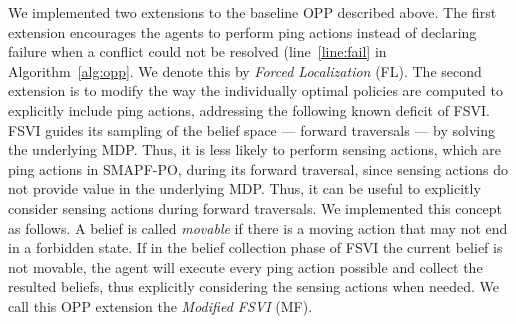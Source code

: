 \documentclass[letterpaper]{article}
\begin{document}
We implemented two extensions to the baseline OPP described above.
The first extension encourages the agents to perform ping actions instead of declaring failure when a conflict could not be resolved (line~\ref{line:fail} in Algorithm~\ref{alg:opp}. We denote this by \emph{Forced Localization} (FL).
The second extension is to modify the way the individually optimal policies are computed to explicitly include ping actions, addressing the following known deficit of FSVI.
FSVI guides its sampling of the belief space --- forward traversals --- by solving the underlying MDP.
Thus, it is less likely to perform sensing actions, which are ping actions in SMAPF-PO, during its forward traversal, since sensing actions do not provide value in the underlying MDP.
Thus, it can be useful to explicitly consider sensing actions during forward traversals.
We implemented this concept as follows.
A belief is called \emph{movable} if there is a moving action that may not end in a forbidden state.
If in the belief collection phase of FSVI the current belief is not movable, the agent will execute every ping action possible and collect the resulted beliefs, thus explicitly considering the sensing actions when needed.
We call this OPP extension the \emph{Modified FSVI} (MF).
\end{document}
